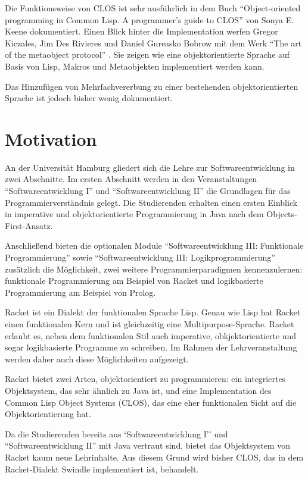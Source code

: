 Die Funktionsweise von CLOS ist sehr ausführlich in dem Buch ``Object-oriented programming in Common Lisp. A programmer's guide to CLOS'' von Sonya E. Keene \cite{keene} dokumentiert. Einen Blick hinter die Implementation werfen Gregor Kiczales, Jim Des Rivieres und Daniel Gureasko Bobrow mit dem Werk ``The art of the metaobject protocol'' \cite{amop}. Sie zeigen wie eine objektorientierte Sprache auf Basis von Lisp, Makros und Metaobjekten implementiert werden kann. 

Das Hinzufügen von Mehrfachvererbung zu einer bestehenden objektorientierten Sprache ist jedoch bisher wenig dokumentiert. 

\section{Motivation} 
An der Universität Hamburg gliedert sich die Lehre zur Softwareentwicklung in zwei Abschnitte. Im ersten Abschnitt werden in den Veranstaltungen ``Softwareentwicklung I'' und ``Softwareentwicklung II'' die Grundlagen für das Programmierverständnis gelegt. Die Studierenden erhalten einen ersten Einblick in imperative und objektorientierte Programmierung in Java nach dem Objects-First-Ansatz.

Anschließend bieten die optionalen Module ``Softwareentwicklung III: Funktionale Programmierung'' sowie ``Softwareentwicklung III: Logikprogrammierung'' zusätzlich die Möglichkeit, zwei weitere  Programmierparadigmen kennenzulernen: funktionale Programmierung am Beispiel von Racket und logikbasierte Programmierung am Beispiel von Prolog.

Racket ist ein Dialekt der funktionalen Sprache Lisp. Genau wie Lisp hat Racket einen funktionalen Kern und ist gleichzeitig eine Mul\-ti\-pur\-pose-Spra\-che. Racket erlaubt es, neben dem funktionalen Stil auch imperative, obkjektorientierte und sogar logikbasierte Programme zu schreiben. Im Rahmen der Lehrveranstaltung werden daher auch diese Möglichkeiten aufgezeigt. 

Racket bietet zwei Arten, objektorientiert zu programmieren: ein integriertes Objektsystem, das sehr ähnlich zu Java ist, und eine Implementation des Common Lisp Object Systems (CLOS), das eine eher funktionalen Sicht auf die Objektorientierung hat. 

Da die Studierenden bereits aus `Softwareentwicklung I'' und ``Softwareentwicklung II'' mit Java vertraut sind, bietet das Objektsystem von Racket kaum neue Lehrinhalte. Aus diesem Grund wird bisher CLOS, das in dem Racket-Dialekt Swindle implementiert ist, behandelt. 

